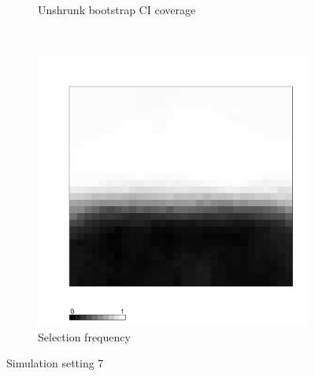 \documentclass[authoryear, review, 11pt]{elsarticle}
\begin{document}
\begin{figure}
\begin{subfigure}[b]{0.45\textwidth}
		\caption{Unshrunk bootstrap CI coverage}
	\end{subfigure}%
	~ %
	\begin{subfigure}[b]{0.45\textwidth}
	\centering
		\includegraphics[width=\textwidth]{../../figures/simulation/X1.15.7.selection.pdf}
		\caption{Selection frequency}
	\end{subfigure}
	\caption{Simulation setting 7}
\end{figure}
	
\clearpage
\end{document}
